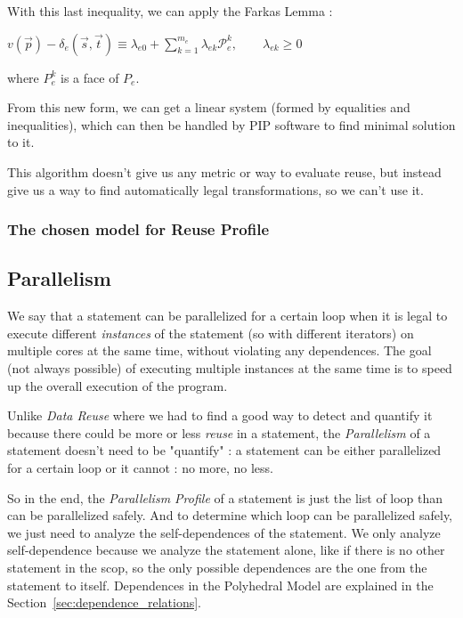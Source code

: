 \documentclass[paper=a4, fontsize=11pt]{scrartcl}
\numberwithin{equation}{section}        %
\numberwithin{figure}{section}          %
\numberwithin{table}{section}               %
\begin{document}
            With this last inequality, we can apply the Farkas Lemma :
            \begin{center}
                $v(\vec{p}) - \delta_e\left(\vec{s},\vec{t}\right) \equiv \lambda_{e0}
                + \sum\limits_{k=1}^{m_e}{\lambda_{ek}\mathcal{P}_{e}^k},\qquad \lambda_{ek} \geq 0$
            \end{center}
            where $P_e^k$ is a face of $P_e$.

            From this new form, we can get a linear system (formed by equalities and
            inequalities), which can then be handled by PIP software to find
            minimal solution to it.

            This algorithm doesn't give us any metric or way to evaluate reuse, but instead
            give us a way to find automatically legal transformations, so we can't use it.


        \subsubsection{The chosen model for Reuse Profile}

    \subsection{Parallelism}
        We say that a statement can be parallelized for a certain loop when it is legal to
        execute different \textit{instances} of the statement (so with different iterators)
        on multiple cores at the same time, without violating any dependences. The
        goal (not always possible) of executing multiple instances at the same time is to
        speed up the overall execution of the program.

        Unlike \textit{Data Reuse} where we had to find a good way to detect and quantify it
        because there could be more or less \textit{reuse} in a statement, the \textit{Parallelism}
        of a statement doesn't need to be "quantify" : a statement can be either parallelized
        for a certain loop or it cannot : no more, no less.

        So in the end, the \textit{Parallelism Profile} of a statement is just the list
        of loop than can be parallelized safely. And to determine which loop can be parallelized
        safely, we just need to analyze the \glspl{self-dependence} of the statement.
        We only analyze \gls{self-dependence} because we analyze the statement alone, 
        like if there is no other statement in the scop, so the only possible dependences
        are the one from the statement to itself.
        Dependences in the Polyhedral Model are explained in the Section~\ref{sec:dependence_relations}.
       
\end{document}
